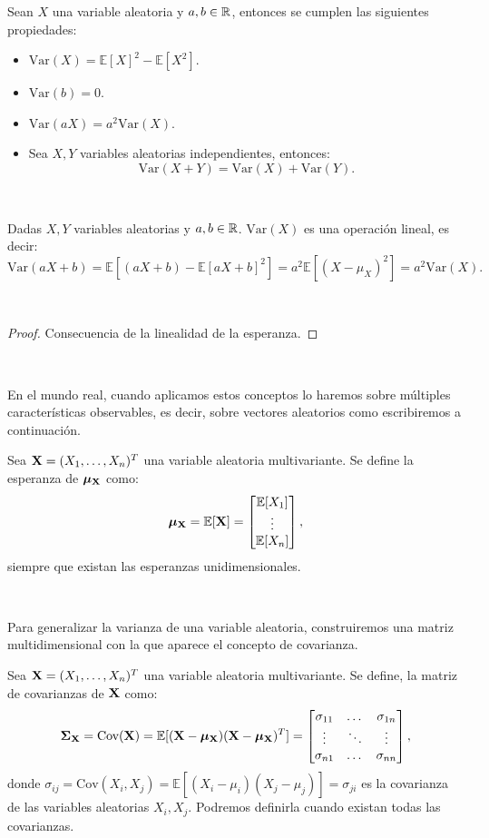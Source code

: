 \documentclass[oneside,openright,titlepage,numbers=noenddot,openany,headinclude,footinclude=true,
cleardoublepage=empty,abstractoff,BCOR=5mm,paper=a4,fontsize=12pt,main=spanish]{scrreprt}
\begin{document}
\begin{proposition}
Sean $X$ una variable aleatoria y $a,b\in \mathbb{R}$, entonces se cumplen las siguientes propiedades:
\begin{itemize}
    \item $\text{Var}(X)=\mathbb{E}[X]^2-\mathbb{E}[X^2].$
    \item $\text{Var}(b)=0.$
    \item $\text{Var}(aX)=a^2\text{Var}(X).$
    \item Sea $X,Y$ variables aleatorias independientes, entonces: $$\text{Var}(X+Y)=\text{Var}(X)+\text{Var}(Y).$$
\end{itemize}
\end{proposition}\

\begin{proposition}
Dadas $X,Y$ variables aleatorias y $a,b\in \mathbb{R}$. $\text{Var}(X)$ es una operación lineal, es decir: $$\text{Var}(aX+b)=\mathbb{E}[(aX+b)-\mathbb{E}[aX+b]^2]=a^2\mathbb{E}[(X-\mu_X)^2]=a^2\text{Var}(X).$$ 
\end{proposition}\

\begin{proof}
Consecuencia de la linealidad de la esperanza.
\end{proof}\

En el mundo real, cuando aplicamos estos conceptos lo haremos sobre múltiples características observables, es decir, sobre vectores aleatorios como escribiremos a continuación.\\

\begin{definition}
Sea $\textbf{X}=(X_1,\dots,X_n)^T$ una variable aleatoria multivariante. Se define la esperanza de $\bm{\mu_{\textbf{X}}}$ como: $$\bm{\mu_{\textbf{X}}}=\mathbb{E}[\textbf{X}]=\begin{bmatrix}
\mathbb{E}[X_1]\\
\vdots\\
\mathbb{E}[X_n]
\end{bmatrix},$$
siempre que existan las esperanzas unidimensionales.
\end{definition}\

Para generalizar la varianza de una variable aleatoria, construiremos una matriz multidimensional con la que aparece el concepto de covarianza.\\

\begin{definition}
Sea $\textbf{X}=(X_1,\dots,X_n)^T$ una variable aleatoria multivariante. Se define, la matriz de covarianzas de $\textbf{X}$ como: $$\bm{\Sigma_{\textbf{X}}} = \text{Cov}(\textbf{X})=\mathbb{E}[(\textbf{X}-\bm{\mu_{\textbf{X}}})(\textbf{X}-\bm{\mu_{\textbf{X}}})^T]=\begin{bmatrix}
\sigma_{11} & \dots & \sigma_{1n}\\
\vdots & \ddots & \vdots\\
\sigma_{n1} & \dots & \sigma_{nn}
\end{bmatrix},$$
donde $\sigma_{ij}=\text{Cov}(X_i,X_j)=\mathbb{E}[(X_i-\mu_i)(X_j-\mu_j)]=\sigma_{ji}$ es la covarianza de las variables aleatorias $X_i,X_j$. Podremos definirla cuando existan todas las covarianzas.
\end{definition}
\end{document}
